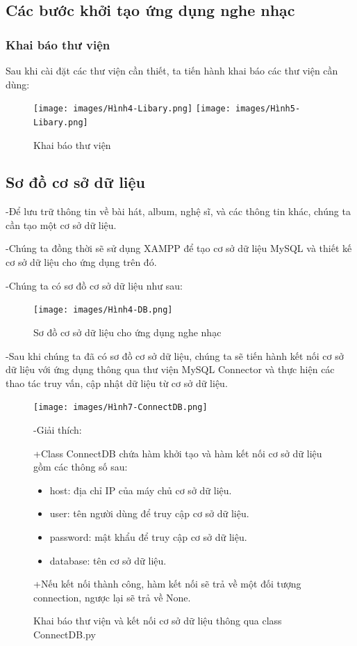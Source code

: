 \documentclass[a4paper]{article}
\begin{document}
\subsection{Các bước khởi tạo ứng dụng nghe nhạc}
\subsubsection{Khai báo thư viện}
\begin{flushleft}
	Sau khi cài đặt các thư viện cần thiết, ta tiến hành khai báo các thư viện cần dùng:
	\begin{figure}[h]
		\centering
		\texttt{[image: images/Hình4-Libary.png]}
		\texttt{[image: images/Hình5-Libary.png]}
		\caption{Khai báo thư viện}
	\end{figure}
\end{flushleft}
\newpage
\subsection{Sơ đồ cơ sở dữ liệu}
\begin{flushleft}
	-Để lưu trữ thông tin về bài hát, album, nghệ sĩ, và các thông tin khác, chúng ta cần tạo một cơ sở dữ liệu.

	-Chúng ta đồng thời sẽ sử dụng XAMPP để tạo cơ sở dữ liệu MySQL và thiết kế cơ sở dữ liệu cho ứng dụng trên đó.

	-Chúng ta có sơ đồ cơ sở dữ liệu như sau:
	\begin{figure}[h]
		\begin{center}
			\texttt{[image: images/Hình4-DB.png]}
			\caption{Sơ đồ cơ sở dữ liệu cho ứng dụng nghe nhạc}
		\end{center}
	\end{figure}

	-Sau khi chúng ta đã có sơ đồ cơ sở dữ liệu, chúng ta sẽ tiến hành kết nối cơ sở dữ liệu với ứng dụng thông qua thư viện MySQL Connector
	và thực hiện các thao tác truy vấn, cập nhật dữ liệu từ cơ sở dữ liệu.

	\begin{figure}
		\centering
		\texttt{[image: images/Hình7-ConnectDB.png]}
		\caption{Khai báo thư viện và kết nối cơ sở dữ liệu thông qua class ConnectDB.py}
		\begin{flushleft}
			-Giải thích:

			+Class ConnectDB chứa hàm khởi tạo và hàm kết nối cơ sở dữ liệu gồm các thông số sau:
			\begin{itemize}
				\item host: địa chỉ IP của máy chủ cơ sở dữ liệu.
				\item user: tên người dùng để truy cập cơ sở dữ liệu.
				\item password: mật khẩu để truy cập cơ sở dữ liệu.
				\item database: tên cơ sở dữ liệu.
			\end{itemize}

			+Nếu kết nối thành công, hàm kết nối sẽ trả về một đối tượng connection, ngược lại sẽ trả về None.
		\end{flushleft}
	\end{figure}

\end{flushleft}
\clearpage
\newpage
\end{document}
